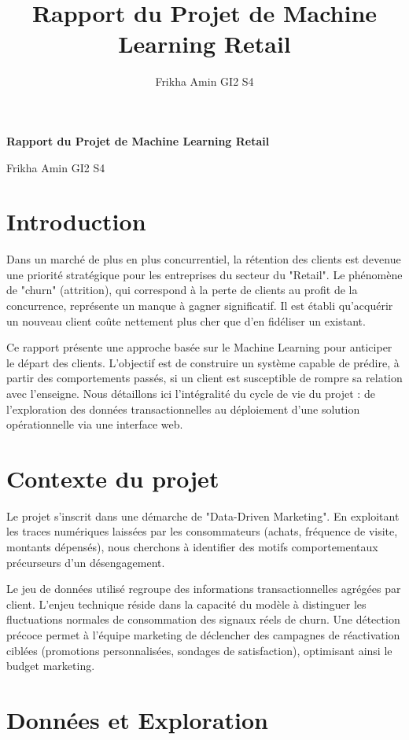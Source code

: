 \documentclass[12pt,a4paper]{article}
\title{Rapport du Projet de Machine Learning Retail}
\author{Frikha Amin GI2 S4}
\begin{document}
\begin{titlepage}
    \centering
    {\Huge\bfseries Rapport du Projet de Machine Learning Retail\par}
    \vspace{1.5cm}
    {\Large Frikha Amin GI2 S4\par}
    \vfill
\end{titlepage}
\newpage
\tableofcontents

\section{Introduction}
Dans un marché de plus en plus concurrentiel, la rétention des clients est devenue une priorité stratégique pour les entreprises du secteur du "Retail". Le phénomène de "churn" (attrition), qui correspond à la perte de clients au profit de la concurrence, représente un manque à gagner significatif. Il est établi qu'acquérir un nouveau client coûte nettement plus cher que d'en fidéliser un existant.

Ce rapport présente une approche basée sur le Machine Learning pour anticiper le départ des clients. L'objectif est de construire un système capable de prédire, à partir des comportements passés, si un client est susceptible de rompre sa relation avec l'enseigne. Nous détaillons ici l'intégralité du cycle de vie du projet : de l'exploration des données transactionnelles au déploiement d'une solution opérationnelle via une interface web.

\section{Contexte du projet}
Le projet s'inscrit dans une démarche de "Data-Driven Marketing". En exploitant les traces numériques laissées par les consommateurs (achats, fréquence de visite, montants dépensés), nous cherchons à identifier des motifs comportementaux précurseurs d'un désengagement.

Le jeu de données utilisé regroupe des informations transactionnelles agrégées par client. L'enjeu technique réside dans la capacité du modèle à distinguer les fluctuations normales de consommation des signaux réels de churn. Une détection précoce permet à l'équipe marketing de déclencher des campagnes de réactivation ciblées (promotions personnalisées, sondages de satisfaction), optimisant ainsi le budget marketing.

\section{Données et Exploration}
\end{document}
